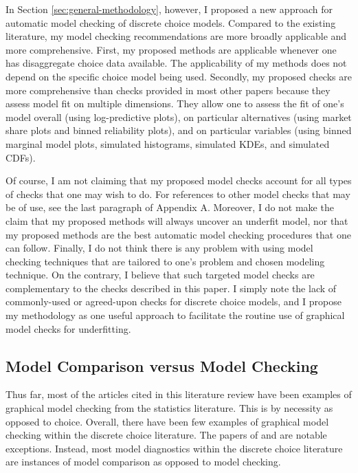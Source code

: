 \documentclass[preprint]{elsarticle}
\begin{document}
In Section \ref{sec:general-methodology}, however, I proposed a new approach for automatic model checking of discrete choice models. Compared to the existing literature, my model checking recommendations are more broadly applicable and more comprehensive. First, my proposed methods are applicable whenever one has disaggregate choice data available. The applicability of my methods does not depend on the specific choice model being used. Secondly, my proposed checks are more comprehensive than checks provided in most other papers because they assess model fit on multiple dimensions. They allow one to assess the fit of one's model overall (using log-predictive plots), on particular alternatives (using market share plots and binned reliability plots), and on particular variables (using binned marginal model plots, simulated histograms, simulated KDEs, and simulated CDFs).

Of course, I am not claiming that my proposed model checks account for all types of checks that one may wish to do. For references to other model checks that may be of use, see the last paragraph of Appendix A. Moreover, I do not make the claim that my proposed methods will always uncover an underfit model, nor that my proposed methods are the best automatic model checking procedures that one can follow. Finally, I do not think there is any problem with using model checking techniques that are tailored to one's problem and chosen modeling technique. On the contrary, I believe that such targeted model checks are complementary to the checks described in this paper. I simply note the lack of commonly-used or agreed-upon checks for discrete choice models, and I propose my methodology as one useful approach to facilitate the routine use of graphical model checks for underfitting.

\subsection{Model Comparison versus Model Checking}
\label{sec:review-model-comparison}
Thus far, most of the articles cited in this literature review have been examples of graphical model checking from the statistics literature. This is by necessity as opposed to choice. Overall, there have been few examples of graphical model checking within the discrete choice literature. The papers of \citet{dunn_graphical_1987} and \citet{nagel_diagnostics_1992} are notable exceptions. Instead, most model diagnostics within the discrete choice literature are instances of model comparison as opposed to model checking.
\end{document}
